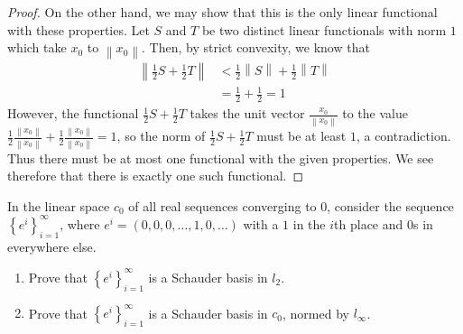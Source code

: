 \documentclass[12pt]{article}
\theoremstyle{definition}
\newenvironment{problem}[2][Problem]{\begin{trivlist}
\item[\hskip \labelsep {\bfseries #1}\hskip \labelsep {\bfseries #2.}]}{\end{trivlist}}
\begin{document}
\begin{proof}
	\par On the other hand, we may show that this is the only linear functional with these properties. Let $S$ and $T$ be two distinct linear functionals with norm $1$ which take $x_0$ to $\left \lVert { x_0 } \right \lVert $. Then, by strict convexity, we know that
	\begin{align*}
		\left \lVert { \frac{1}{2} S + \frac{1}{2} T } \right \lVert &< \frac{1}{2} \left \lVert { S } \right \lVert + \frac{1}{2} \left \lVert { T } \right \lVert\\
		&= \frac{1}{2} + \frac{1}{2} = 1
	\end{align*}
	However, the functional $\frac{1}{2}S + \frac{1}{2} T$ takes the unit vector $\frac{x_0}{\left \lVert { x_0 } \right \lVert }$ to the value $\frac{1}{2} \frac{\left \lVert { x_0 } \right \lVert }{\left \lVert { x_0 } \right \lVert } + \frac{1}{2}\frac{\left \lVert { x_0 } \right \lVert }{\left \lVert { x_0 } \right \lVert } = 1$, so the norm of $\frac{1}{2}S + \frac{1}{2} T$ must be at least $1$, a contradiction. Thus there must be at most one functional with the given properties. We see therefore that there is exactly one such functional.
\end{proof}
\begin{problem}{5}
	In the linear space $c_0$ of all real sequences converging to $0$, consider the sequence $\left\{ e^i \right\}_{i=1}^\infty$, where $e^i = \left( 0,0,0,\dots,1,0,\dots \right)$ with a $1$ in the $i$th place and $0$s in everywhere else.
	\begin{enumerate}[label=(\roman*)]
		\item Prove that $\left\{ e^i \right\}_{i=1}^\infty$ is a Schauder basis in $l_2$.
		\item Prove that $\left\{ e^i \right\}_{i=1}^\infty$ is a Schauder basis in $c_0$, normed by $l_\infty$.
	\end{enumerate}
\end{problem}
\end{document}
